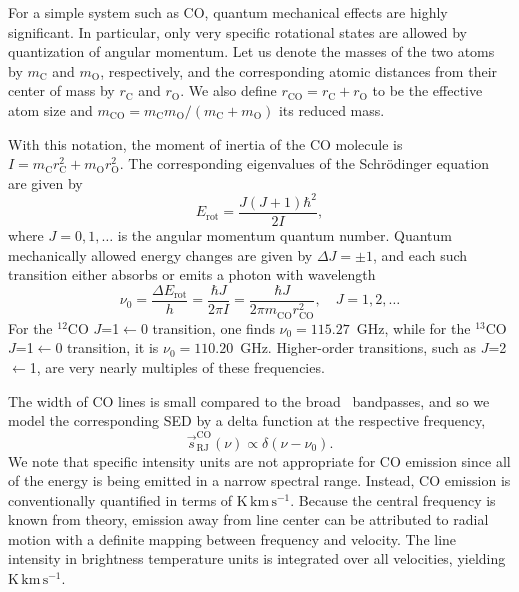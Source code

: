 \documentclass[twocolumn]{aa}
\newcommand{\s}[0]{\vec{s}}
\begin{document}
For a simple system such as CO, quantum mechanical effects are highly
significant. In particular, only very specific rotational states are
allowed by quantization of angular momentum. Let us denote the masses
of the two atoms by $m_{\mathrm{C}}$ and $m_{\mathrm{O}}$,
respectively, and the corresponding atomic distances from their center
of mass by $r_{\mathrm{C}}$ and $r_{\mathrm{O}}$. We also define
$r_{\mathrm{CO}}=r_{\mathrm{C}}+r_{\mathrm{O}}$ to be the effective
atom size and $m_{\mathrm{CO}} =
m_{\mathrm{C}}m_{\mathrm{O}}/(m_{\mathrm{C}}+m_{\mathrm{O}})$ its
reduced mass.

With this notation, the moment of inertia of the CO molecule is $I =
m_{\mathrm{C}}^{\phantom 2}r_{\mathrm{C}}^2 + m_{\mathrm{O}}^{\phantom 2}r_{\mathrm{O}}^2$. The
corresponding eigenvalues of the Schr\"odinger equation are given by
\begin{equation}
  E_{\mathrm{rot}} = \frac{J(J+1)\hbar^2}{2I},
\end{equation}
where $J=0,1,\ldots$ is the angular momentum quantum number. Quantum
mechanically allowed energy changes are given by $\Delta J=\pm1$, and
each such transition either absorbs or emits a photon with wavelength
\begin{equation}
  \nu_0 = \frac{\Delta E_{\mathrm{rot}}}{h} = \frac{\hbar J}{2\pi I}
	= \frac{\hbar J}{2\pi m_\mathrm{CO}^{\phantom{2}} r_{\mathrm{CO}}^2}, \quad J = 1, 2, \ldots
\end{equation}
For the $^{12}\mathrm{CO}$ $J$=1$\leftarrow$0 transition, one finds
$\nu_0=115.27$~GHz, while for the $^{13}\mathrm{CO}$ $J$=1$\leftarrow$0
transition, it is $\nu_0=110.20$~GHz. Higher-order transitions, such
as $J$=2$\leftarrow$1, are very
nearly multiples of these frequencies.

The width of CO lines is small compared to the broad \Planck\ bandpasses, 
and so we model the corresponding SED by a delta function at the
respective frequency,
\begin{equation}
\s^{\mathrm{CO}}_{\mathrm{RJ}}(\nu) \propto
\delta(\nu-\nu_0).
\label{eq:CO}
\end{equation}
We note that specific intensity units are not appropriate for
CO emission since all of the energy is being emitted in a narrow
spectral range. Instead, CO
emission is conventionally quantified in terms of
$\mathrm{K}\,\mathrm{km}\,\mathrm{s}^{-1}$. Because the central frequency
is known from theory, emission away from line center can be attributed
to radial motion with a definite mapping between frequency and velocity.
The line intensity in brightness temperature units is integrated over
all velocities, yielding $\mathrm{K}\,\mathrm{km}\,\mathrm{s}^{-1}$.
\end{document}
